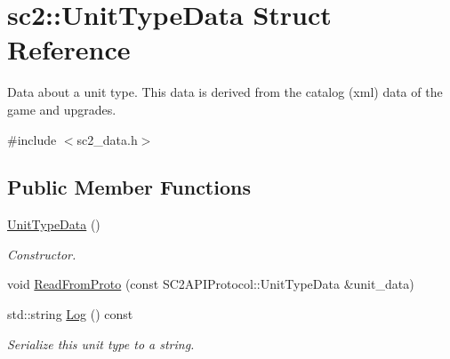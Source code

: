 \hypertarget{structsc2_1_1_unit_type_data}{}\section{sc2\+:\+:Unit\+Type\+Data Struct Reference}
\label{structsc2_1_1_unit_type_data}


Data about a unit type. This data is derived from the catalog (xml) data of the game and upgrades.  




{\ttfamily \#include $<$sc2\+\_\+data.\+h$>$}

\subsection*{Public Member Functions}
\begin{DoxyCompactItemize}
\item 
\mbox{\label{structsc2_1_1_unit_type_data_a69b29058353cf665ed27c32c1976f98b}} 
\hyperlink{structsc2_1_1_unit_type_data_a69b29058353cf665ed27c32c1976f98b}{Unit\+Type\+Data} ()
\begin{DoxyCompactList}\small\item\em Constructor. \end{DoxyCompactList}\item 
void \hyperlink{structsc2_1_1_unit_type_data_a4d05b07420d5c202b9f397968428254d}{Read\+From\+Proto} (const S\+C2\+A\+P\+I\+Protocol\+::\+Unit\+Type\+Data \&unit\+\_\+data)
\item 
\mbox{\label{structsc2_1_1_unit_type_data_a815413cf7f47aa41f20c3399b7d6f58c}} 
std\+::string \hyperlink{structsc2_1_1_unit_type_data_a815413cf7f47aa41f20c3399b7d6f58c}{Log} () const
\begin{DoxyCompactList}\small\item\em Serialize this unit type to a string. \end{DoxyCompactList}\end{DoxyCompactItemize}
